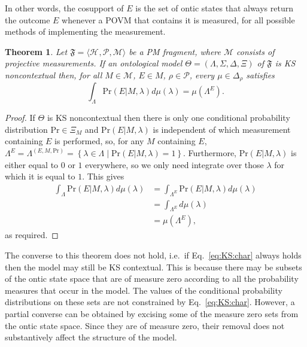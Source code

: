 \documentclass[DIV=calc,paper=a4,fontsize=11pt,twocolumn]{scrartcl} %
\theoremstyle{definition}
\theoremstyle{plain}
\newtheorem{theorem}[definition]{Theorem}
\newcommand{\Hilb}[1][]{\ensuremath{\mathcal{H}_{#1}}}
\begin{document}
In other words, the cosupport of $E$ is the set of ontic states that
always return the outcome $E$ whenever a POVM that contains it is
measured, for all possible methods of implementing the measurement.

\begin{theorem}
\label{prop:KS:char}
Let $\mathfrak{F} = \langle \Hilb, \mathcal{P}, \mathcal{M} \rangle$
be a PM fragment, where $\mathcal{M}$ consists of projective
measurements.  If an ontological model $\Theta = (\Lambda, \Sigma,
\Delta, \Xi)$ of $\mathfrak{F}$ is KS noncontextual then, for all $M
\in \mathcal{M}$, $E \in M$, $\rho \in \mathcal{P}$, every $\mu \in
\Delta_{\rho}$ satisfies
\begin{equation}
\label{eq:KS:char}
\int_{\Lambda} \mathrm{Pr}(E|M,\lambda) d\mu(\lambda) = \mu(\Lambda^E).
\end{equation}
\end{theorem}
\begin{proof}
If $\Theta$ is KS noncontextual then there is only one conditional
probability distribution $\text{Pr} \in \Xi_M$ and
$\text{Pr}(E|M,\lambda)$ is independent of which measurement
containing $E$ is performed, so, for any $M$ containing $E$,
$\Lambda^E = \Lambda^{(E,M,\text{Pr})} = \left \{ \lambda \in
\Lambda \middle | \text{Pr}(E|M,\lambda) = 1 \right \}$.
Furthermore, $\text{Pr}(E|M,\lambda)$ is either equal to $0$ or $1$
everywhere, so we only need integrate over those $\lambda$ for which
it is equal to $1$.  This gives
\begin{align}
\int_{\Lambda} \text{Pr}(E|M,\lambda) d \mu(\lambda) & =
\int_{\Lambda^E} \text{Pr}(E|M,\lambda) d \mu(\lambda) \\
& = \int_{\Lambda^E} d \mu(\lambda) \\
& = \mu(\Lambda^E),
\end{align}
as required.
\end{proof}

The converse to this theorem does not hold, i.e.\ if
Eq.~\eqref{eq:KS:char} always holds then the model may still be KS
contextual.  This is because there may be subsets of the ontic state
space that are of measure zero according to all the probability
measures that occur in the model.  The values of the conditional
probability distributions on these sets are not constrained by
Eq.~\eqref{eq:KS:char}.  However, a partial converse can be obtained
by excising some of the measure zero sets from the ontic state space.
Since they are of measure zero, their removal does not substantively
affect the structure of the model.
\end{document}

